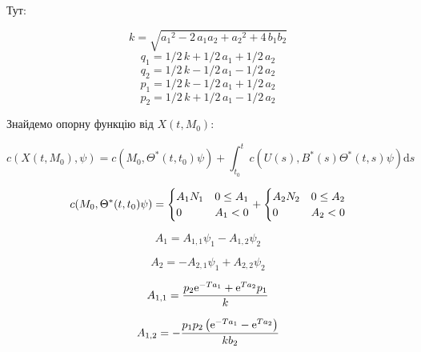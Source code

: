 \documentclass{article}
\begin{document}
Тут:

\begin{equation}
{k}=\sqrt {{a_{{1}}}^{2}-2\,a_{{1}}a_{{2}}+{a_{{2}}}^{2}+4\,b_{{1}}b_{{2}}}
\end{equation}
\begin{equation}
q_{{1}}=1/2\,{k}+1/2\,a_{{1}}+1/2\,a_{{2}}
\end{equation}
\begin{equation}
q_{{2}}=1/2\,{k}-1/2\,a_{{1}}-1/2\,a_{{2}}
\end{equation}
\begin{equation}
p_{{1}}=1/2\,{k}-1/2\,a_{{1}}+1/2\,a_{{2}}
\end{equation}
\begin{equation}
p_{{2}}=1/2\,{k}+1/2\,a_{{1}}-1/2\,a_{{2}}
\end{equation}

Знайдемо опорну функцію від $X(t, M_0)$:

\begin{equation}
c(X(t, M_0) , \psi) = c(M_0,\Theta^* (t, t_0) \psi) +\int_{t_0}^t c(U(s), B^*(s) \Theta^* (t, s) \psi)\mathrm{d}s
\end{equation}

\begin{equation}
c(M_0,\Theta^* (t, t_0) \psi) =
\begin{cases}
A_{{1}}N_{{1}}&0\leq A_{{1}}\cr 0&A_{{1}}<0\cr
\end{cases}
+
\begin{cases}
A_{{2}}N_{{2}}&0\leq A_{{2}}\cr 0&A_{{2}}<0\cr
\end{cases}
\end{equation}


\begin{equation}
A_{{1}}=A_{{1,1}}\psi_{{1}}-A_{{1,2}}\psi_{{2}}
\end{equation}

\begin{equation}
A_{{2}}=-A_{{2,1}}\psi_{{1}}+A_{{2,2}}\psi_{{2}}
\end{equation}

\begin{equation}
A_{{1,1}}={\frac {p_{{2}}{{\rm e}^{-Ta_{{1}}}}+{{\rm e}^{Ta_{{2}}}}p_{{1}}}{k}}
\end{equation}

\begin{equation}
A_{{1,2}}=-{\frac {p_{{1}}p_{{2}} \left( {{\rm e}^{-Ta_{{1}}}}-{
{\rm e}^{Ta_{{2}}}} \right) }{kb_{{2}}}}
\end{equation}
\end{document}
